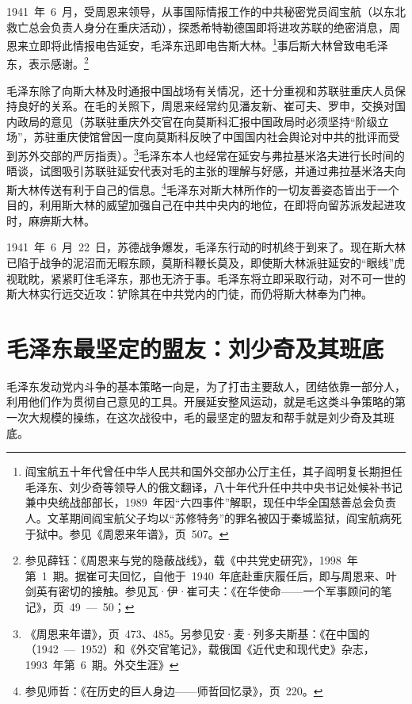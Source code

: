 1941~年~6~月，受周恩来领导，从事国际情报工作的中共秘密党员阎宝航（以东北救亡总会负责人身分在重庆活动），探悉希特勒德国即将进攻苏联的绝密消息，周恩来立即将此情报电告延安，毛泽东迅即电告斯大林。\footnote{阎宝航五十年代曾任中华人民共和国外交部办公厅主任，其子阎明复长期担任毛泽东、刘少奇等领导人的俄文翻译，八十年代升任中共中央书记处候补书记兼中央统战部部长，1989~年因“六四事件”解职，现任中华全国慈善总会负责人。文革期间阎宝航父子均以“苏修特务”的罪名被囚于秦城监狱，阎宝航病死于狱中。参见《周恩来年谱》，页~507。}事后斯大林曾致电毛泽东，表示感谢。\footnote{参见薛钰：《周恩来与党的隐蔽战线》，载《中共党史研究》，1998~年第~1~期。据崔可夫回忆，自他于~1940~年底赴重庆履任后，即与周恩来、叶剑英有密切的接触。参见瓦·伊·崔可夫：《在华使命——一个军事顾问的笔记》，页~49~—~50；}

毛泽东除了向斯大林及时通报中国战场有关情况，还十分重视和苏联驻重庆人员保持良好的关系。在毛的关照下，周恩来经常约见潘友新、崔可夫、罗申，交换对国内政局的意见（苏联驻重庆外交官在向莫斯科汇报中国政局时必须坚持“阶级立场”，苏驻重庆使馆曾因一度向莫斯科反映了中国国内社会舆论对中共的批评而受到苏外交部的严厉指责）。\footnote{《周恩来年谱》，页~473、485。另参见安·麦·列多夫斯基：《在中国的（1942~—~1952）和《外交官笔记》，载俄国《近代史和现代史》杂志，1993~年第~6~期。外交生涯》}毛泽东本人也经常在延安与弗拉基米洛夫进行长时间的晤谈，试图吸引苏联驻延安代表对毛的主张的理解与好感，并通过弗拉基米洛夫向斯大林传送有利于自己的信息。\footnote{参见师哲：《在历史的巨人身边——师哲回忆录》，页~220。}毛泽东对斯大林所作的一切友善姿态皆出于一个目的，利用斯大林的威望加强自己在中共中央内的地位，在即将向留苏派发起进攻时，麻痹斯大林。

1941~年~6~月~22~日，苏德战争爆发，毛泽东行动的时机终于到来了。现在斯大林已陷于战争的泥沼而无暇东顾，莫斯科鞭长莫及，即使斯大林派驻延安的“眼线”虎视耽眈，紧紧盯住毛泽东，那也无济于事。毛泽东将立即采取行动，对不可一世的斯大林实行远交近攻：铲除其在中共党内的门徒，而仍将斯大林奉为门神。

\section{毛泽东最坚定的盟友：刘少奇及其班底}

毛泽东发动党内斗争的基本策略一向是，为了打击主要敌人，团结依靠一部分人，利用他们作为贯彻自己意见的工具。开展延安整风运动，就是毛这类斗争策略的第一次大规模的操练，在这次战役中，毛的最坚定的盟友和帮手就是刘少奇及其班底。

